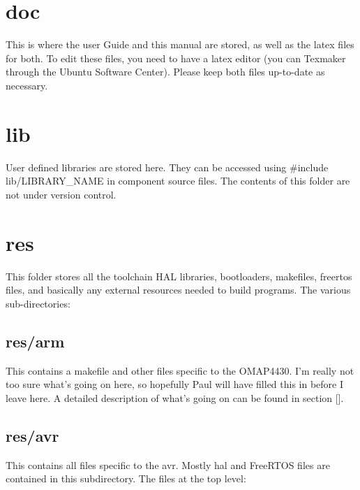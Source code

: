 \documentclass[a4paper, oneside, 11pt, titlepage, onecolumn, openright]{report}
\begin{document}
\section{doc}
			\label{s:doc}
			This is where the user Guide and this manual are stored, as well as the latex files for both. To edit these files, you need to have a latex editor (you can Texmaker through the Ubuntu Software Center). Please keep both files up-to-date as necessary.
			
\section{lib}
			\label{s:lib}
			User defined libraries are stored here. They can be accessed using \#include lib/LIBRARY\_NAME in component source files. The contents of this folder are not under version control.
			
\section{res}
			\label{s:res}
			This folder stores all the toolchain HAL libraries, bootloaders, makefiles, freertos files, and basically any external resources needed to build programs. The various sub-directories:
			
\subsection{res/arm}
			\label{ss:res/arm}
			This contains a makefile and other files specific to the OMAP4430. I'm really not too sure what's going on here, so hopefully Paul will have filled this in before I leave here. A detailed description of what's going on can be found in section [].
			
\subsection{res/avr}
			\label{ss:res/avr}
			This contains all files specific to the avr. Mostly hal and FreeRTOS files are contained in this subdirectory. The files at the top level:
			
\end{document}
